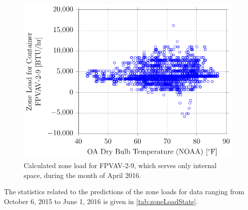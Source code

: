 \begin{figure}
\centering
\includegraphics[]{Plots/2016-06-22-1716-ZoneLoadforContainerFPVAV29vsOADryBulbTemperatureNOAA.pdf}
\caption{Calculated zone load for FPVAV-2-9, which serves only internal space, during the month of April 2016.}
\label{fig:ZoneLoadforContainerFPVAV29vsOADryBulbTemperatureNOAA}
\end{figure}


The statistics related to the predictions of the zone loads for data ranging from October 6, 2015 to June 1, 2016 is given in \tableref{} \ref{tab:zoneLoadStats}.



